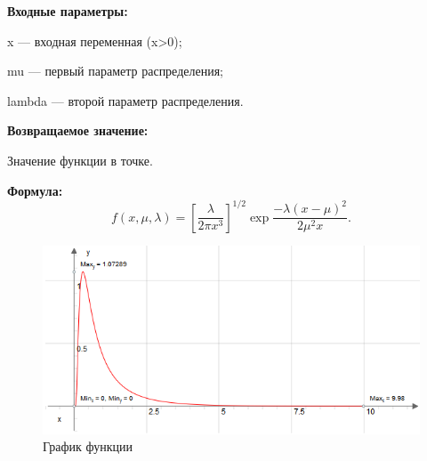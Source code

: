 \textbf{Входные параметры:}

  x --- входная переменная (x>0);
  
 mu --- первый параметр распределения;
 
 lambda --- второй параметр распределения.

\textbf{Возвращаемое значение:}
 
 Значение функции в точке.
 
\textbf{Формула:}
\begin{equation*}
f(x,\mu,\lambda) = \left[\frac{\lambda}{2 \pi x^3}\right]^{1/2} \exp{\frac{-\lambda (x-\mu)^2}{2 \mu^2 x}}.
\end{equation*}

 \begin{figure} [h] 
   \center
   \includegraphics {MHL_ProbabilityDensityFunctionOfInverseGaussianDistribution_Graph.png}
   \caption{График функции} 
   \label{img:MHL_ProbabilityDensityFunctionOfInverseGaussianDistribution_Graph}  
 \end{figure}
 
